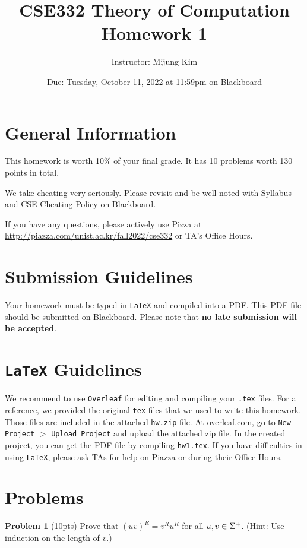 \documentclass{article}
\title{CSE332 Theory of Computation \\ Homework 1}
\author{Instructor: Mijung Kim}
\date{Due: Tuesday, October 11, 2022 at 11:59pm on Blackboard}
\begin{document}
\maketitle

\section*{General Information}
This homework is worth 10\% of your final grade. It has 10 problems worth 130 points in total.

\noindent We take cheating very  seriously. Please revisit and be well-noted with Syllabus and CSE Cheating Policy on Blackboard. 

\noindent If you have any questions, please actively use Pizza at \url{http://piazza.com/unist.ac.kr/fall2022/cse332} or TA's Office Hours.


\section*{Submission Guidelines} 

Your homework must be typed in \texttt{LaTeX} and compiled into a PDF. This PDF file should be submitted on Blackboard. Please note that \textbf{no late submission will be accepted}.

\section*{\texttt{LaTeX} Guidelines}

We recommend to use \texttt{Overleaf} for editing and compiling your \texttt{.tex} files. For a reference, we provided the original \texttt{tex} files that we used to write this homework. Those files are included in the attached \texttt{hw.zip} file.  At \url{overleaf.com},  go to \texttt{New Project} $>$ \texttt{Upload Project} and upload the attached zip file. In the created project, you can get the PDF file by compiling \texttt{hw1.tex}. If you have difficulties in using  \texttt{LaTeX}, please ask TAs for help on Piazza or during their Office Hours. 

\section*{Problems} 

\noindent \textbf{Problem 1} (10pts) Prove that $(uv)^{R} = v^{R}u^{R}$ for all $u,v \in \Sigma^{+}$. (Hint: Use induction on the length of $v$.) \\
\end{document}
